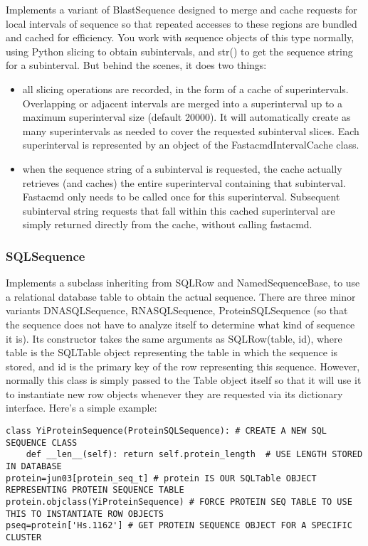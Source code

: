 \documentclass{howto}
\begin{document}
Implements a variant of BlastSequence designed to merge and cache requests for local intervals of sequence so that repeated accesses to these regions are bundled and cached for efficiency.  You work with sequence objects of this type normally, using Python slicing to obtain subintervals, and str() to get the sequence string for a subinterval.  But behind the scenes, it does two things:

\begin{itemize}
\item
all slicing operations are recorded, in the form of a cache of superintervals.  Overlapping or adjacent intervals are merged into a superinterval up to a maximum superinterval size (default 20000).  It will automatically create as many superintervals as needed to cover the requested subinterval slices.  Each superinterval is represented by an object of the FastacmdIntervalCache class.

\item 
when the sequence string of a subinterval is requested, the cache actually retrieves (and caches) the entire superinterval containing that subinterval.  Fastacmd only needs to be called once for this superinterval.  Subsequent subinterval string requests that fall within this cached superinterval are simply returned directly from the cache, without calling fastacmd.

\end{itemize}

\subsubsection{SQLSequence}

Implements a subclass inheriting from SQLRow and NamedSequenceBase, to use a relational database table to obtain the actual sequence.  There are three minor variants DNASQLSequence, RNASQLSequence, ProteinSQLSequence (so that the sequence does not have to analyze itself to determine what kind of sequence it is).  Its constructor takes the same arguments as SQLRow(table, id), where table is the SQLTable object representing the table in which the sequence is stored, and id is the primary key of the row representing this sequence.  However, normally this class is simply passed to the Table object itself so that it will use it to instantiate new row objects whenever they are requested via its dictionary interface.  Here's a simple example:

\begin{verbatim}
class YiProteinSequence(ProteinSQLSequence): # CREATE A NEW SQL SEQUENCE CLASS
    def __len__(self): return self.protein_length  # USE LENGTH STORED IN DATABASE
protein=jun03[protein_seq_t] # protein IS OUR SQLTable OBJECT REPRESENTING PROTEIN SEQUENCE TABLE
protein.objclass(YiProteinSequence) # FORCE PROTEIN SEQ TABLE TO USE THIS TO INSTANTIATE ROW OBJECTS
pseq=protein['Hs.1162'] # GET PROTEIN SEQUENCE OBJECT FOR A SPECIFIC CLUSTER
\end{verbatim}
\end{document}
